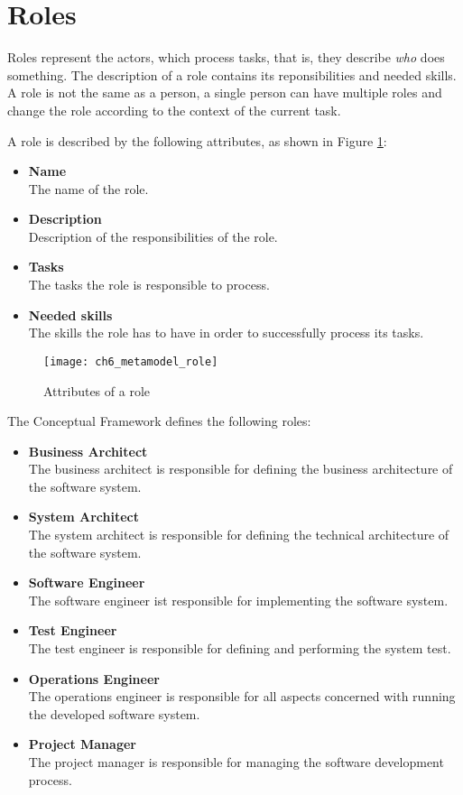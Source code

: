 \section{Roles}
\label{sec:ch6_roles}

Roles represent the actors, which process tasks, that is, they describe \emph{who} does something. The description of a role contains its reponsibilities and needed skills. 
A role is not the same as a person, a single person can have multiple roles and change the role according to the context of the current task.

A role is described by the following attributes, as shown in Figure \ref{fig:ch6_metamodel_role}:
\begin{itemize}
	\item \textbf{Name}\\
	The name of the role.
	\item \textbf{Description}\\
	Description of the responsibilities of the role.
	\item \textbf{Tasks}\\
	The tasks the role is responsible to process.
	\item \textbf{Needed skills}\\
	The skills the role has to have in order to successfully process its tasks.
\end{itemize}

\begin{figure}[htpb] \centering 
	\texttt{[image: ch6\_metamodel\_role]} 
	\caption{Attributes of a role} 
	\label{fig:ch6_metamodel_role} 
\end{figure}

The Conceptual Framework defines the following roles:
\begin{itemize}
	\item \textbf{Business Architect}\\
	The business architect is responsible for defining the business architecture of the software system.
	\item \textbf{System Architect}\\ 
	The system architect is responsible for defining the technical architecture of the software system.
	\item \textbf{Software Engineer}\\
	The software engineer ist responsible for implementing the software system.
	\item \textbf{Test Engineer}\\
	The test engineer is responsible for defining and performing the system test.
	\item \textbf{Operations Engineer}\\
	The operations engineer is responsible for all aspects concerned with running the developed software system.
	\item \textbf{Project Manager}\\
	The project manager is responsible for managing the software development process.
\end{itemize}

